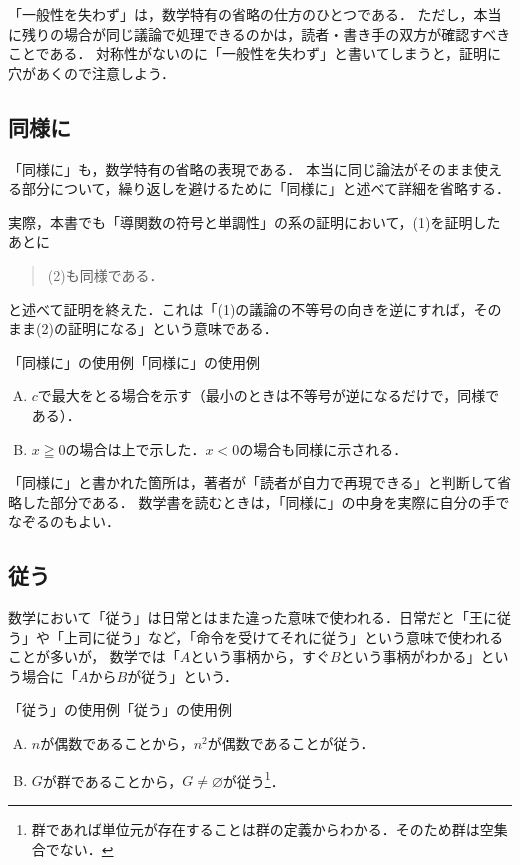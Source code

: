 「一般性を失わず」は，数学特有の省略の仕方のひとつである．
ただし，本当に残りの場合が同じ議論で処理できるのかは，読者・書き手の双方が確認すべきことである．
対称性がないのに「一般性を失わず」と書いてしまうと，証明に穴があくので注意しよう．

\subsection{同様に}

「同様に」も，数学特有の省略の表現である．
本当に同じ論法がそのまま使える部分について，繰り返しを避けるために「同様に」と述べて詳細を省略する．

実際，本書でも「導関数の符号と単調性」の系の証明において，(1)を証明したあとに
\begin{quote}
  (2)も同様である．
\end{quote}
と述べて証明を終えた．これは「(1)の議論の不等号の向きを逆にすれば，そのまま(2)の証明になる」という意味である．

\begin{example}{「同様に」の使用例}{「同様に」の使用例}
  \begin{enumerate}[(A)]
    \item $c$で最大をとる場合を示す（最小のときは不等号が逆になるだけで，同様である）．
    \item $x \geqq 0$の場合は上で示した．$x<0$の場合も同様に示される．
  \end{enumerate}
\end{example}

「同様に」と書かれた箇所は，著者が「読者が自力で再現できる」と判断して省略した部分である．
数学書を読むときは，「同様に」の中身を実際に自分の手でなぞるのもよい．

\subsection{従う}

数学において「従う」は日常とはまた違った意味で使われる．日常だと「王に従う」や「上司に従う」など，「命令を受けてそれに従う」という意味で使われることが多いが，
数学では「$A$という事柄から，すぐ$B$という事柄がわかる」という場合に「$A$から$B$が従う」という．

\begin{example}{「従う」の使用例}{「従う」の使用例}
  \begin{enumerate}[(A)]
    \item $n$が偶数であることから，$n^2$が偶数であることが従う．\label{enu:偶数ならば偶数}
    \item $G$が群であることから，$G \ne \varnothing$が従う\footnote{群であれば単位元が存在することは群の定義からわかる．そのため群は空集合でない．}．\label{enu:群の例}
  \end{enumerate}
\end{example}

